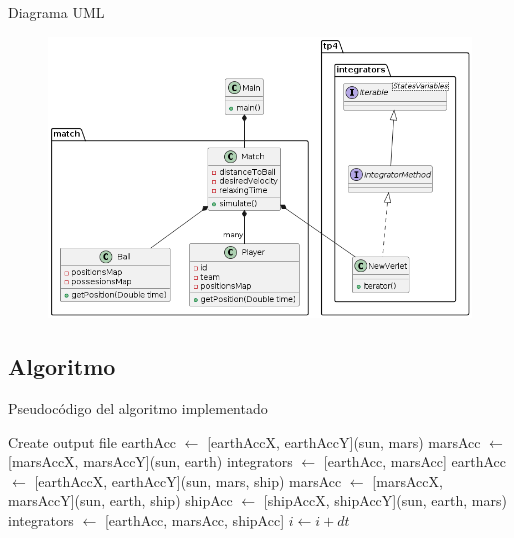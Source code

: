 \documentclass{beamer}
\begin{document}
            \begin{frame}{Diagrama UML}
                \begin{figure}[htbp]
                    \centering
                    \includegraphics[width=\textwidth]{./architecture}
                    \label{fig:architecture}
                \end{figure}
            \end{frame}

        \subsection{Algoritmo}

            \begin{frame}{Pseudocódigo del algoritmo implementado}{}
                \begin{algorithmic}[1]
                    \ttfamily \scriptsize
                    \State Create output file
                    \State earthAcc $\gets$ [earthAccX, earthAccY](sun, mars)
                    \State marsAcc $\gets$ [marsAccX, marsAccY](sun, earth)
                    \State integrators $\gets$ [earthAcc, marsAcc]
                            \State earthAcc $\gets$ [earthAccX, earthAccY](sun, mars, ship)
                            \State marsAcc $\gets$ [marsAccX, marsAccY](sun, earth, ship)
                            \State shipAcc $\gets$ [shipAccX, shipAccY](sun, earth, mars)
                            \State integrators $\gets$ [earthAcc, marsAcc, shipAcc]
                        \EndIf
                        \State {}
                        \State {}
                            \State {}
                        \EndIf
                        \State {}
                        \State $i \gets i + dt$
                    \EndWhile
                \end{algorithmic}
            \end{frame}
\end{document}
